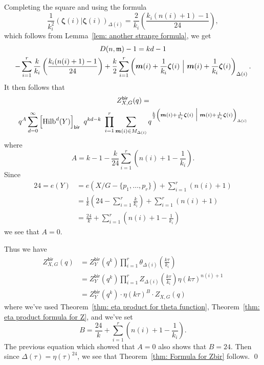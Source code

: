 \documentclass{amsart}
\theoremstyle{definition}
\newcommand{\bir}{\mathsf{bir}}
\newcommand{\mdata}{\mathfrak{m}}
\newcommand{\mvec}{\bm{m}}
\newcommand{\zetavec}{\bm{\zeta }}
\newcommand{\Hilb}{\operatorname{Hilb}}
\begin{document}
Completing the square and using the formula
\[
\frac{1}{k_{i}^{2}}  \left(\zetavec (i)|\zetavec (i)
\right)_{\Delta (i)} = \frac{2}{k_{i}}\left(\frac{k_{i}(n(i)+1)-1}{24} \right),
\]
which follows from Lemma~\ref{lem: another strange formula}, we get 
\begin{gather*}
D(n,\mdata )-1 = kd-1 \\  - \sum_{i=1}^{r}
\frac{k}{k_{i}}\left(\frac{k_{i}(n(i)+1)-1}{24} \right)
+\frac{k}{2}\sum_{i=1}^{r} \left(\mvec (i)+\frac{1}{k_{i}}\zetavec
(i)\,\,\Big{|}\,\,\mvec (i)+\frac{1}{k_{i}}\zetavec (i) \right)_{\Delta (i)} . 
\end{gather*}
It then follows that
\begin{gather*}
Z^{\bir}_{X,G}(q) = \\ q^{A} \sum_{d=0}^{\infty} \left[\Hilb^{d}(Y)
\right]_{\bir} \,\, q^{kd-k} \,\, \prod_{i=1}^{r} \sum_{\mvec (i)\in
M_{\Delta (i)}} q^{\frac{k}{2} \left(\mvec (i)+\frac{1}{k_{i}}\zetavec
(i)\,\,\Big{|}\,\,\mvec (i)+\frac{1}{k_{i}}\zetavec (i) \right)_{\Delta (i)} } 
\end{gather*}
where
\[
A = k-1 -\frac{k}{24} \sum_{i=1}^{r} \left(n(i) + 1 - \frac{1}{k_{i}}
\right). 
\]
Since 
\begin{align*}
24 = e(Y) &= e\left(X/G - \{p_{1},\dotsc ,p_{r} \} \right) +
\sum_{i=1}^{r} (n(i)+1)\\
&=\frac{1}{k} \left(24 - \sum_{i=1}^{r} \frac{k}{k_{i}} \right)
+\sum_{i=1}^{r} (n(i)+1)\\
&= \frac{24}{k} + \sum_{i=1}^{r} \left(n(i)+1 -\frac{1}{k_{i}} \right)
\end{align*}
we see that $A=0$.

Thus we have
\begin{align*}
Z^{\bir}_{X,G} (q) &= Z^{\bir}_{Y}(q^{k}) \prod_{i=1}^{r}
\theta_{\Delta (i)} \left(\frac{k\tau}{k_{i}} \right) \\
&= Z^{\bir}_{Y}(q^{k}) \prod_{i=1}^{r}
Z_{\Delta (i)} \left(\frac{k\tau}{k_{i}} \right)\eta (k\tau )^{n(i)+1} \\
&=Z_{Y}^{\bir} (q^{k})\cdot  \eta (k\tau )^{B}\cdot  Z_{X,G}(q) 
\end{align*}
where we've used Theorem~\ref{thm: eta product for theta function},
Theorem~\ref{thm: eta product formula for Z}, and we've set
\[
B=\frac{24}{k} + \sum_{i=1}^{r} \left(n(i)+1 -\frac{1}{k_{i}}
\right). 
\]
The previous equation which showed that $A=0$ also shows that
$B=24$. Then since $\Delta (\tau ) = \eta (\tau )^{24}$, we see that
Theorem~\ref{thm: Formula for Zbir} follows. \qed
\end{document}

